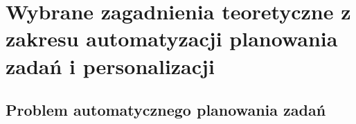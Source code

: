 










\section{Wybrane zagadnienia teoretyczne z zakresu automatyzacji
planowania zadań i personalizacji}

\subsection{Problem automatycznego planowania zadań}

